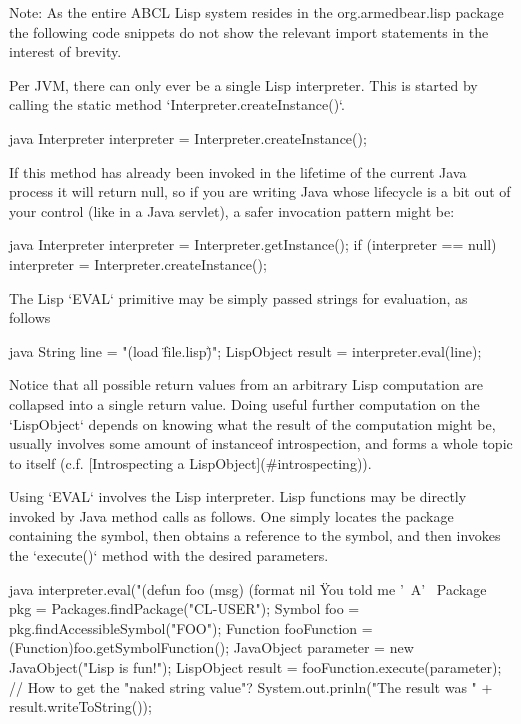 \documentclass[10pt]{article}
\begin{document}

Note: As the entire ABCL Lisp system resides in the org.armedbear.lisp
package the following code snippets do not show the relevant import
statements in the interest of brevity.

Per JVM, there can only ever be a single Lisp interpreter.  This is
started by calling the static method `Interpreter.createInstance()`.

\begin{code}{java}
Interpreter interpreter = Interpreter.createInstance();
\end{code}

If this method has already been invoked in the lifetime of the current
Java process it will return null, so if you are writing Java whose
lifecycle is a bit out of your control (like in a Java servlet), a
safer invocation pattern might be:

\begin{code}{java}
Interpreter interpreter = Interpreter.getInstance();
if (interpreter == null) {
  interpreter = Interpreter.createInstance();
}
\end{code}



The Lisp `EVAL` primitive may be simply passed strings for evaluation,
as follows

\begin{code}{java}   
String line = "(load \"file.lisp\")";
LispObject result = interpreter.eval(line);
\end{code}


Notice that all possible return values from an arbitrary Lisp
computation are collapsed into a single return value.  Doing useful
further computation on the `LispObject` depends on knowing what the
result of the computation might be, usually involves some amount
of instanceof introspection, and forms a whole topic to itself
(c.f. [Introspecting a LispObject](#introspecting)).  

Using `EVAL` involves the Lisp interpreter.  Lisp functions may be
directly invoked by Java method calls as follows.  One simply locates
the package containing the symbol, then obtains a reference to the
symbol, and then invokes the `execute()` method with the desired
parameters.

\begin{code}{java}   
    interpreter.eval("(defun foo (msg) (format nil \"You told me '~A'~%
    Package pkg = Packages.findPackage("CL-USER");
    Symbol foo = pkg.findAccessibleSymbol("FOO"); 
    Function fooFunction = (Function)foo.getSymbolFunction();
    JavaObject parameter = new JavaObject("Lisp is fun!");
    LispObject result = fooFunction.execute(parameter);
    // How to get the "naked string value"?
    System.out.prinln("The result was " + result.writeToString()); 
\end{code}
\end{document}
